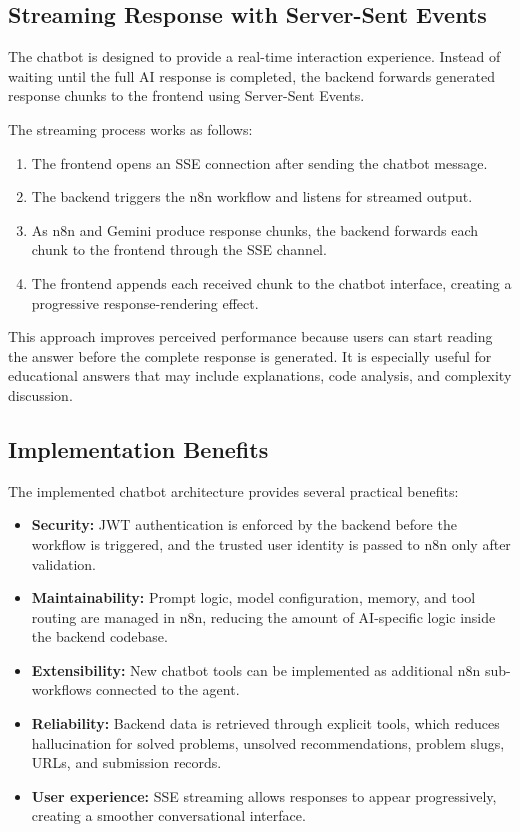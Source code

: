 \subsection{Streaming Response with Server-Sent Events}

The chatbot is designed to provide a real-time interaction experience. Instead of waiting until the full AI response is completed, the backend forwards generated response chunks to the frontend using Server-Sent Events.

The streaming process works as follows:
\begin{enumerate}
    \item The frontend opens an SSE connection after sending the chatbot message.
    
    \item The backend triggers the n8n workflow and listens for streamed output.
    
    \item As n8n and Gemini produce response chunks, the backend forwards each chunk to the frontend through the SSE channel.
    
    \item The frontend appends each received chunk to the chatbot interface, creating a progressive response-rendering effect.
\end{enumerate}

This approach improves perceived performance because users can start reading the answer before the complete response is generated. It is especially useful for educational answers that may include explanations, code analysis, and complexity discussion.

\subsection{Implementation Benefits}

The implemented chatbot architecture provides several practical benefits:
\begin{itemize}
    \item \textbf{Security:} JWT authentication is enforced by the backend before the workflow is triggered, and the trusted user identity is passed to n8n only after validation.
    
    \item \textbf{Maintainability:} Prompt logic, model configuration, memory, and tool routing are managed in n8n, reducing the amount of AI-specific logic inside the backend codebase.
    
    \item \textbf{Extensibility:} New chatbot tools can be implemented as additional n8n sub-workflows connected to the agent.
    
    \item \textbf{Reliability:} Backend data is retrieved through explicit tools, which reduces hallucination for solved problems, unsolved recommendations, problem slugs, URLs, and submission records.
    
    \item \textbf{User experience:} SSE streaming allows responses to appear progressively, creating a smoother conversational interface.
\end{itemize}
